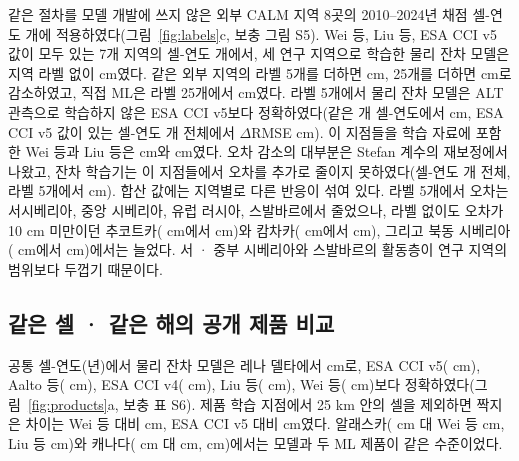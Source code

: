 같은 절차를 모델 개발에 쓰지 않은 외부 CALM 지역 8곳의 2010--2024년 채점 셀-연도 \nftScoredRows{}개에 적용하였다(그림~\ref{fig:labels}c, 보충 그림 S5). Wei 등, Liu 등, ESA CCI v5 값이 모두 있는 7개 지역의 셀-연도 \nftrows{}개에서, 세 연구 지역으로 학습한 물리 잔차 모델은 지역 라벨 없이 \nftAllRszero{} cm였다. 같은 외부 지역의 라벨 5개를 더하면 \nftAllRsfive{} cm, 25개를 더하면 \nftAllRstwfive{} cm로 감소하였고, 직접 ML은 라벨 25개에서 \nftAllDstwfive{} cm였다. 라벨 5개에서 물리 잔차 모델은 ALT 관측으로 학습하지 않은 ESA CCI v5보다 정확하였다(같은 \nftrows{}개 셀-연도에서 \nftAllCcifivezero{} cm, ESA CCI v5 값이 있는 셀-연도 \nftdCciRows{}개 전체에서 $\Delta$RMSE \nftdRsCcifivefive{} cm). 이 지점들을 학습 자료에 포함한 Wei 등과 Liu 등은 \nftAllWeizero{} cm와 \nftAllLiuzero{} cm였다. 오차 감소의 대부분은 Stefan 계수의 재보정에서 나왔고, 잔차 학습기는 이 지점들에서 오차를 추가로 줄이지 못하였다(셀-연도 \nftScoredRows{}개 전체, 라벨 5개에서 \nftdRsPnfive{} cm). 합산 값에는 지역별로 다른 반응이 섞여 있다. 라벨 5개에서 오차는 서시베리아, 중앙 시베리아, 유럽 러시아, 스발바르에서 줄었으나, 라벨 없이도 오차가 10 cm 미만이던 추코트카(\nftChRszero{} cm에서 \nftChRsfive{} cm)와 캄차카(\nftKaRszero{} cm에서 \nftKaRsfive{} cm), 그리고 북동 시베리아(\nftNsRszero{} cm에서 \nftNsRsfive{} cm)에서는 늘었다. 서 · 중부 시베리아와 스발바르의 활동층이 연구 지역의 범위보다 두껍기 때문이다.

\subsection{같은 셀 · 같은 해의 공개 제품 비교}
공통 셀-연도(\nyrscc{}년)에서 물리 잔차 모델은 레나 델타에서 \nccLeRoall{} cm로, ESA CCI v5(\nccLeCcifiveall{} cm), Aalto 등(\nccLeAaltoall{} cm), ESA CCI v4(\nccLeCcifourall{} cm), Liu 등(\nccLeLiuall{} cm), Wei 등(\nccLeWeiall{} cm)보다 정확하였다(그림~\ref{fig:products}a, 보충 표 S6). 제품 학습 지점에서 25 km 안의 셀을 제외하면 짝지은 차이는 Wei 등 대비 \ndprodLeweiRomask{} cm, ESA CCI v5 대비 \ndprodLeccifiveRomask{} cm였다. 알래스카(\nccAkRoall{} cm 대 Wei 등 \nccAkWeiall{} cm, Liu 등 \nccAkLiuall{} cm)와 캐나다(\nccCaRoall{} cm 대 \nccCaWeiall{} cm, \nccCaLiuall{} cm)에서는 모델과 두 ML 제품이 같은 수준이었다.


